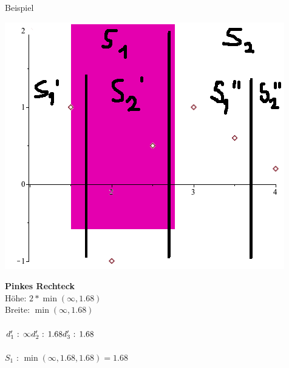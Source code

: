\documentclass[18pt]{beamer}
\begin{document}
		\begin{frame}{Beispiel}
			\begin{minipage}{0.45\textwidth}
				\includegraphics[width =\textwidth]{logos/PlotsBetter0gg.png}
			\end{minipage}
			\begin{minipage}{0.45\textwidth}
				\textbf{Pinkes Rechteck}\\
				Höhe: $ 2 * \min(\infty, 1.68)$\\ Breite: $ \min(\infty, 1.68) $\\
				\ \\
				$d_1' \text{ : }  \infty \\
				d_2'  \text{ : }  1.68 \\
				d_3'  \text{ : }  1.68$ \\ 
				\ \\
				$S_1 \text{ : } \min(\infty, 1.68, 1.68) = 1.68$
			\end{minipage}
		\end{frame}
\end{document}

